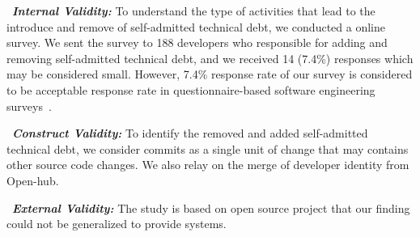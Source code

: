\noindent~\textbf{\textit{Internal Validity:}}
To understand the type of activities that lead to the introduce and remove of self-admitted technical debt, we conducted a online survey. We sent the survey to 188 developers who responsible for adding and removing self-admitted technical debt, and we received 14 (7.4\%) responses which may be considered small. However, 7.4\% response rate of our survey is considered to be acceptable response rate in questionnaire-based
software engineering surveys~\cite{singer2008software}.

\noindent~\textbf{\textit{Construct Validity:}}
To identify the removed and added self-admitted technical debt, we consider commits as a single unit of change that may contains other source code changes. We also relay on the merge of developer identity from Open-hub.

\noindent~\textbf{\textit{External Validity:}} The study is based on open source project that our finding could not be generalized to provide systems.